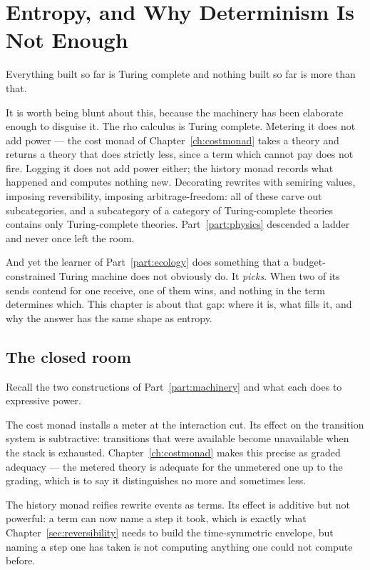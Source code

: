 \chapter{Entropy, and Why Determinism Is Not Enough}
\label{ch:ent}

Everything built so far is Turing complete and nothing built so far is
more than that.

It is worth being blunt about this, because the machinery has been
elaborate enough to disguise it.
The rho calculus is Turing complete.
Metering it does not add power --- the cost monad of
Chapter~\ref{ch:costmonad} takes a theory and returns a theory that does
strictly less, since a term which cannot pay does not fire.
Logging it does not add power either; the history monad records what
happened and computes nothing new.
Decorating rewrites with semiring values, imposing reversibility,
imposing arbitrage-freedom: all of these carve out subcategories, and a
subcategory of a category of Turing-complete theories contains only
Turing-complete theories.
Part~\ref{part:physics} descended a ladder and never once left the room.

And yet the learner of Part~\ref{part:ecology} does something that a
budget-constrained Turing machine does not obviously do.
It \emph{picks}.
When two of its sends contend for one receive, one of them wins, and
nothing in the term determines which.
This chapter is about that gap: where it is, what fills it, and why the
answer has the same shape as entropy.

\section{The closed room}

Recall the two constructions of Part~\ref{part:machinery} and what each
does to expressive power.

The cost monad installs a meter at the interaction cut.
Its effect on the transition system is subtractive: transitions that were
available become unavailable when the stack is exhausted.
Chapter~\ref{ch:costmonad} makes this precise as graded adequacy --- the
metered theory is adequate for the unmetered one up to the grading, which
is to say it distinguishes no more and sometimes less.

The history monad reifies rewrite events as terms.
Its effect is additive but not powerful: a term can now name a step it
took, which is exactly what Chapter~\ref{sec:reversibility} needs to
build the time-symmetric envelope, but naming a step one has taken is
not computing anything one could not compute before.

